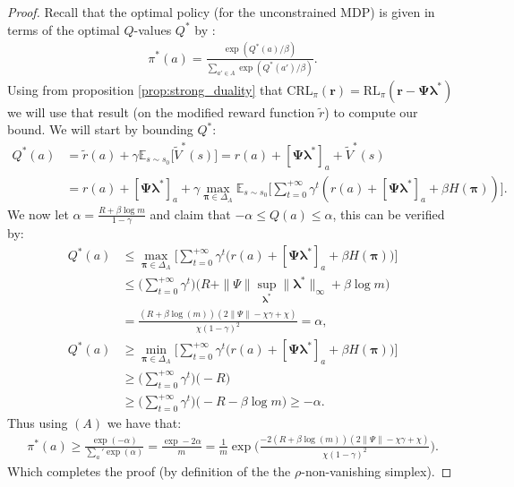 \begin{proof}
    Recall that the optimal policy (for the unconstrained MDP) is given in terms of the optimal $Q$-values $Q^*$ by : 
    \begin{align*}
        \pi^*(a) = \frac{\exp(Q^*(a)/\beta)}{\sum_{a'\in A}\exp(Q^*(a')/\beta)}. \tag{A}
    \end{align*}
    Using from proposition \ref{prop:strong_duality} that $\text{CRL}_\pi(\bm{r}) = \text{RL}_\pi(\bm{r} - \bm{\Psi} \bm{\lambda}^*)$ we will use that result (on the modified reward function $\tilde{r}$) to compute our bound. We will start by bounding $Q^*$:
    \begin{align*}
        Q^*(a) &= \tilde{r}(a) + \gamma \mathbb{E}_{s \sim s_0} \Big[ \tilde{V}^*(s) \Big] 
        = r(a) + [\bm{\Psi} \bm{\lambda}^*]_a + \tilde{V}^*(s) \\
        & =  r(a) + [\bm{\Psi} \bm{\lambda}^*]_a  + \gamma  \max_{\bm{\pi}\in \Delta_A} \mathbb{E}_{s \sim s_0} \Big[ \sum_{t=0}^{+\infty} \gamma^t ( r(a) + [\bm{\Psi} \bm{\lambda}^*]_a +\beta H(\bm{\pi})) \Big].
    \end{align*}
    We now let $\alpha = \frac{R + \beta \log m}{1-\gamma}$ and claim that $-\alpha \leq Q(a) \leq \alpha$, this can be verified by:
    \begin{align*}
        Q^*(a) &\leq \max_{\bm{\pi}\in \Delta_A} \Bigg[ \sum_{t=0}^{+\infty} \gamma^t \bigl( r(a)+ [\bm{\Psi} \bm{\lambda}^*]_a + \beta H(\bm{\pi}) \bigr) \Bigg]\\
        &\leq  \Big( \sum_{t=0}^{+\infty} \gamma^t \Big) \Big( R + \| \Psi \| \sup_{\bm{\lambda}^*} \|\bm{\lambda}^*\|_\infty + \beta \log m \Big)\\
        &= \frac{\left(R + \beta \log{\left(m \right)}\right) \left(2  \|\Psi\| - \chi \gamma + \chi\right)}{\chi \left(1- \gamma\right)^{2}}
        = \alpha,\\
        Q^*(a) &\geq \min_{\bm{\pi}\in \Delta_A} \Bigg[ \sum_{t=0}^{+\infty} \gamma^t \bigl( r(a) + [\bm{\Psi} \bm{\lambda}^*]_a  + \beta H(\bm{\pi}) \bigr) \Bigg]\\
        &\geq  \Big( \sum_{t=0}^{+\infty} \gamma^t \Big) \Big( -R \Big)
        \\ &\geq  \Big( \sum_{t=0}^{+\infty} \gamma^t \Big) \Big( -R - \beta \log m \Big) \geq -\alpha.
    \end{align*}
    Thus using $(A)$ we have that:
    \begin{align*}
        \pi^*(a) \geq \frac{\exp(-\alpha)}{\sum_a' \exp(\alpha)} 
        = \frac{\exp -2 \alpha}{m} 
        = \frac{1}{m} \exp \Bigg(\frac{-2\left(R + \beta \log{\left(m \right)}\right) \left(2  \|\Psi\| - \chi \gamma + \chi\right)}{\chi \left(1- \gamma\right)^{2}} \Bigg).
    \end{align*}
    Which completes the proof (by definition of the the $\rho$-non-vanishing simplex).
\end{proof}


